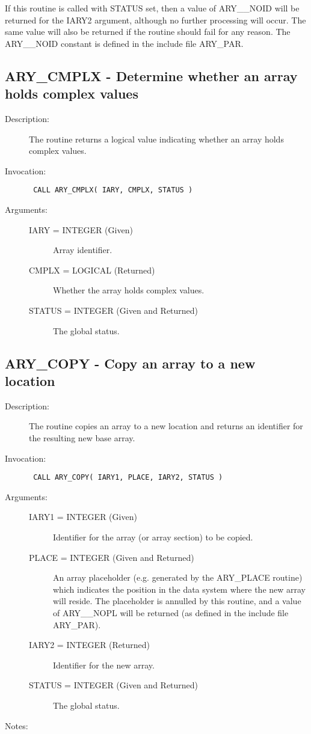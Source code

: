 \documentclass[twoside,11pt]{article}
\newcommand{\xlabel}[1]{}
\newlength{\sstbannerlength}
\newlength{\sstcaptionlength}
\newlength{\sstexampleslength}
\newlength{\sstexampleswidth}
\newcommand{\sstroutine}[3]{
   \goodbreak
   \rule{\textwidth}{0.5mm}
   \vspace{-7ex}
   \newline
   \settowidth{\sstbannerlength}{{\Large {\bf #1}}}
   \setlength{\sstcaptionlength}{\textwidth}
   \setlength{\sstexampleslength}{\textwidth}
   \addtolength{\sstbannerlength}{0.5em}
   \addtolength{\sstcaptionlength}{-2.0\sstbannerlength}
   \addtolength{\sstcaptionlength}{-5.0pt}
   \settowidth{\sstexampleswidth}{{\bf Examples:}}
   \addtolength{\sstexampleslength}{-\sstexampleswidth}
   \parbox[t]{\sstbannerlength}{\flushleft{\Large {\bf #1}}}
   \parbox[t]{\sstcaptionlength}{\center{\Large #2}}
   \parbox[t]{\sstbannerlength}{\flushright{\Large {\bf #1}}}
   \begin{description}
      #3
   \end{description}
}
\newcommand{\sstdescription}[1]{\item[Description:] #1}
\newcommand{\sstinvocation}[1]{\item[Invocation:]\hspace{0.4em}{\tt #1}}
\newcommand{\sstarguments}[1]{
   \item[Arguments:] \mbox{} \\
   \vspace{-3.5ex}
   \begin{description}
      #1
   \end{description}
}
\newcommand{\sstsubsection}[1]{ \item[{#1}] \mbox{} \\}
\newcommand{\sstnotes}[1]{\item[Notes:] \mbox{} \\[1.3ex] #1}
\newcommand{\sstitemlist}[1]{
  \mbox{} \\
  \vspace{-3.5ex}
  \begin{itemize}
     #1
  \end{itemize}
}
\newcommand{\sstitem}{\item}
\newcommand{\ssttt}{\tt}
\renewcommand{\sstroutine}[3]{
      \subsection{#1\xlabel{#1}-\label{#1}#2}
      \begin{description}
         #3
      \end{description}
   }
\renewcommand{\sstdescription}[1]{\item[Description:]
      \begin{description}
         #1
      \end{description}
   }
\renewcommand{\sstinvocation}[1]{\item[Invocation:]
      \begin{description}
         {\ssttt #1}
      \end{description}
   }
\renewcommand{\sstarguments}[1]{
      \item[Arguments:]
      \begin{description}
         #1
      \end{description}
   }
\renewcommand{\sstsubsection}[1]{\item[{#1}]}
\renewcommand{\sstnotes}[1]{\item[Notes:]
      \begin{description}
         #1
      \end{description}
   }
\newcommand{\sstitemlist}[1]{
      \begin{itemize}
         #1
      \end{itemize}
   }
\begin{document}
\begin{eqn*}
{{{         \sstitem
         If this routine is called with STATUS set, then a value of
         ARY\_\_NOID will be returned for the IARY2 argument, although no
         further processing will occur. The same value will also be
         returned if the routine should fail for any reason. The ARY\_\_NOID
         constant is defined in the include file ARY\_PAR.
      }
   }
}
\sstroutine{
   ARY\_CMPLX
}{
   Determine whether an array holds complex values
}{
   \sstdescription{
      The routine returns a logical value indicating whether an array
      holds complex values.
   }
   \sstinvocation{
      CALL ARY\_CMPLX( IARY, CMPLX, STATUS )
   }
   \sstarguments{
      \sstsubsection{
         IARY = INTEGER (Given)
      }{
         Array identifier.
      }
      \sstsubsection{
         CMPLX = LOGICAL (Returned)
      }{
         Whether the array holds complex values.
      }
      \sstsubsection{
         STATUS = INTEGER (Given and Returned)
      }{
         The global status.
      }
   }
}
\sstroutine{
   ARY\_COPY
}{
   Copy an array to a new location
}{
   \sstdescription{
      The routine copies an array to a new location and returns an
      identifier for the resulting new base array.
   }
   \sstinvocation{
      CALL ARY\_COPY( IARY1, PLACE, IARY2, STATUS )
   }
   \sstarguments{
      \sstsubsection{
         IARY1 = INTEGER (Given)
      }{
         Identifier for the array (or array section) to be copied.
      }
      \sstsubsection{
         PLACE = INTEGER (Given and Returned)
      }{
         An array placeholder (e.g. generated by the ARY\_PLACE routine)
         which indicates the position in the data system where the new
         array will reside. The placeholder is annulled by this
         routine, and a value of ARY\_\_NOPL will be returned (as defined
         in the include file ARY\_PAR).
      }
      \sstsubsection{
         IARY2 = INTEGER (Returned)
      }{
         Identifier for the new array.
      }
      \sstsubsection{
         STATUS = INTEGER (Given and Returned)
      }{
         The global status.
      }
   }
   \sstnotes{
      \sstitemlist{

}}}
\end{eqn*}
\end{document}
